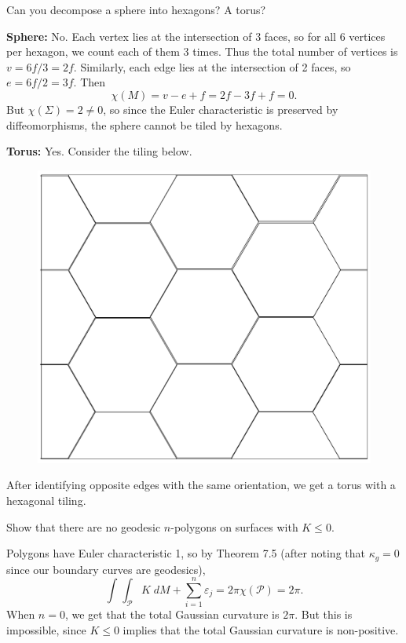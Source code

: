 \documentclass[10pt]{report}
\begin{document}
\begin{exer}[7.6: 9]
Can you decompose a sphere into hexagons? A torus?
\end{exer}
\textbf{Sphere:} No. Each vertex lies at the intersection of 3 faces, so for all 6 vertices per hexagon, we count each of them 3 times. Thus the total number of vertices is $v = 6f/3 = 2f$. Similarly, each edge lies at the intersection of 2 faces, so $e = 6f/2 = 3f$. Then
\[
	\chi(M) = v-e+f = 2f-3f+f = 0.
\] But $\chi(\Sigma)=2 \neq 0$, so since the Euler characteristic is preserved by diffeomorphisms, the sphere cannot be tiled by hexagons.

\textbf{Torus:} Yes. Consider the tiling below.
\begin{figure}[H]
	\centering
	\includegraphics[scale=0.2]{fig/torus}
\end{figure}
After identifying opposite edges with the same orientation, we get a torus with a hexagonal tiling.


\pagebreak
\begin{exer}[7.7: 2]
Show that there are no geodesic $n$-polygons on surfaces with $K \leq 0$.
\end{exer}
Polygons have Euler characteristic 1, so by Theorem 7.5 (after noting that $\kappa_{g}=0$ since our boundary curves are geodesics),
\[
	\int_{} \int_{\mathscr{P}} K\;dM + \sum_{i=1}^{n} \varepsilon_{j}= 2\pi\chi(\mathscr{P}) = 2\pi.
\] 
When $n=0$, we get that the total Gaussian curvature is $2\pi$. But this is impossible, since $K \leq 0$ implies that the total Gaussian curvature is non-positive.
\end{document}
